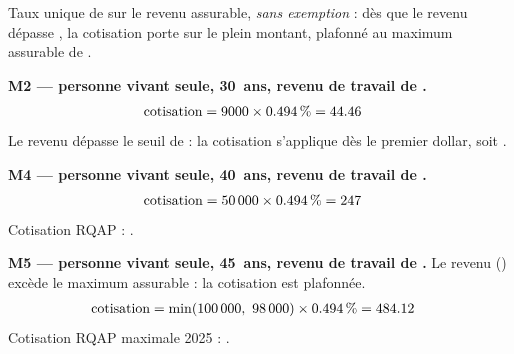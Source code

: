 \pexemples Taux unique de  sur le revenu assurable, \emph{sans
exemption} : dès que le revenu dépasse , la cotisation porte sur
le plein montant, plafonné au maximum assurable de .

\medskip\noindent\textbf{M2 --- personne vivant seule, 30~ans, revenu de travail de .}
\begin{align*}
\text{cotisation} &= \num{9000} \times \num{0.494}\,\% = \num{44.46}
\end{align*}
Le revenu dépasse le seuil de  : la cotisation s'applique dès le
premier dollar, soit .

\medskip\noindent\textbf{M4 --- personne vivant seule, 40~ans, revenu de travail de .}
\begin{align*}
\text{cotisation} &= \num{50000} \times \num{0.494}\,\% = \num{247}
\end{align*}
Cotisation RQAP : .

\medskip\noindent\textbf{M5 --- personne vivant seule, 45~ans, revenu de travail de .}
Le revenu () excède le maximum assurable : la cotisation
est plafonnée.
\begin{align*}
\text{cotisation} &= \min(\num{100000},\ \num{98000}) \times \num{0.494}\,\% = \num{484.12}
\end{align*}
Cotisation RQAP maximale 2025 : .
